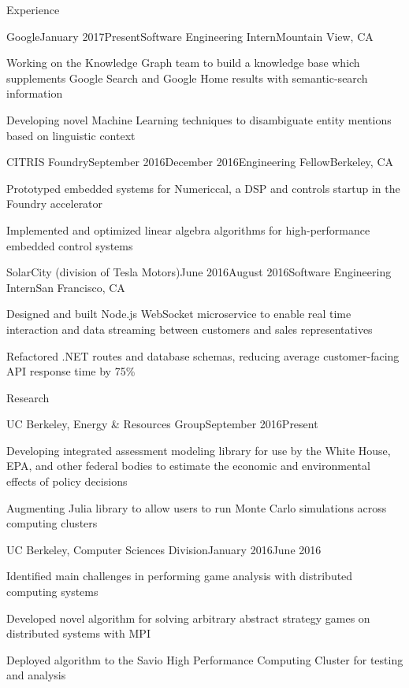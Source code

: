 \documentclass{resume} %
\begin{document}
\begin{rSection}{Experience}
\begin{rSubsection}{Google}{January 2017\textminus Present}{Software Engineering Intern}{Mountain View, CA}
\item[] Working on the Knowledge Graph team to build a knowledge base which supplements Google Search and Google Home results with semantic-search information 
\item[] Developing novel Machine Learning techniques to disambiguate entity mentions based on linguistic context
\end{rSubsection}
\begin{rSubsection}{CITRIS Foundry}{September 2016\textminus December 2016}{Engineering Fellow}{Berkeley, CA}
\item[] Prototyped embedded systems for Numericcal, a DSP and controls startup in the Foundry accelerator
\item[] Implemented and optimized linear algebra algorithms for high-performance embedded control systems
\end{rSubsection}
\begin{rSubsection}{SolarCity (division of Tesla Motors)}{June 2016\textminus August 2016}{Software Engineering Intern}{San Francisco, CA}
\item[] Designed and built Node.js WebSocket microservice to enable real time interaction and data streaming between customers and sales representatives
\item[] Refactored .NET routes and database schemas, reducing average customer-facing API response time by 75\%
\end{rSubsection}
\end{rSection}



\begin{rSection}{Research}
\begin{rSubsection}{UC Berkeley, Energy \& Resources Group}{September 2016\textminus Present}{}{}
\item[] Developing integrated assessment modeling library for use by the White House, EPA, and other federal bodies to estimate the economic and environmental effects of policy decisions 
\item[] Augmenting Julia library to allow users to run Monte Carlo simulations across computing clusters
\end{rSubsection}
\begin{rSubsection}{UC Berkeley, Computer Sciences Division}{January 2016\textminus June 2016}{}{}
\item[] Identified main challenges in performing game analysis with distributed computing systems
\item[] Developed novel algorithm for solving arbitrary abstract strategy games on distributed systems with MPI
\item[] Deployed algorithm to the Savio High Performance Computing Cluster for testing and analysis
\end{rSubsection}
\end{rSection}
\end{document}
